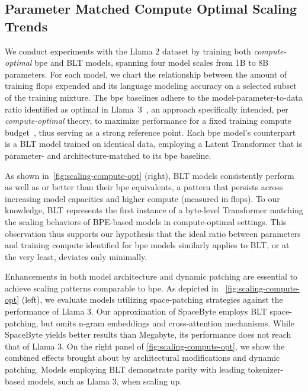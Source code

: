 \subsection{Parameter Matched Compute Optimal Scaling Trends}
\label{section:parameter-matched-scaling}
We conduct experiments with the Llama 2 dataset by training both \textit{compute-optimal} bpe and {\textsc BLT} models, spanning four model scales from 1B to 8B parameters. For each model, we chart the relationship between the amount of training flops expended and its language modeling accuracy on a selected subset of the training mixture. The bpe baselines adhere to the model-parameter-to-data ratio identified as optimal in Llama~3~\citep{dubey2024llama}, an approach specifically intended, per \textit{compute-optimal} theory, to maximize performance for a fixed training compute budget~\citep{hoffmann2022training}, thus serving as a strong reference point. Each bpe model’s counterpart is a {\textsc BLT} model trained on identical data, employing a Latent Transformer that is parameter- and architecture-matched to its bpe baseline.

As shown in~\autoref{fig:scaling-compute-opt} (right), {\textsc BLT} models consistently perform as well as or better than their bpe equivalents, a pattern that persists across increasing model capacities and higher compute (measured in flops). To our knowledge, {\textsc BLT} represents the first instance of a byte-level Transformer matching the scaling behaviors of BPE-based models in compute-optimal settings. This observation thus supports our hypothesis that the ideal ratio between parameters and training compute identified for bpe models similarly applies to {\textsc BLT}, or at the very least, deviates only minimally.

Enhancements in both model architecture and dynamic patching are essential to achieve scaling patterns comparable to bpe. As depicted in ~\autoref{fig:scaling-compute-opt} (left), we evaluate models utilizing space-patching strategies against the performance of Llama 3. Our approximation of SpaceByte \citep{slagle2024spacebyte} employs {\textsc BLT} space-patching, but omits n-gram embeddings and cross-attention mechanisms. While SpaceByte yields better results than Megabyte, its performance does not reach that of Llama 3. On the right panel of \autoref{fig:scaling-compute-opt}, we show the combined effects brought about by architectural modifications and dynamic patching. Models employing {\textsc BLT} demonstrate parity with leading tokenizer-based models, such as Llama 3, when scaling up.

